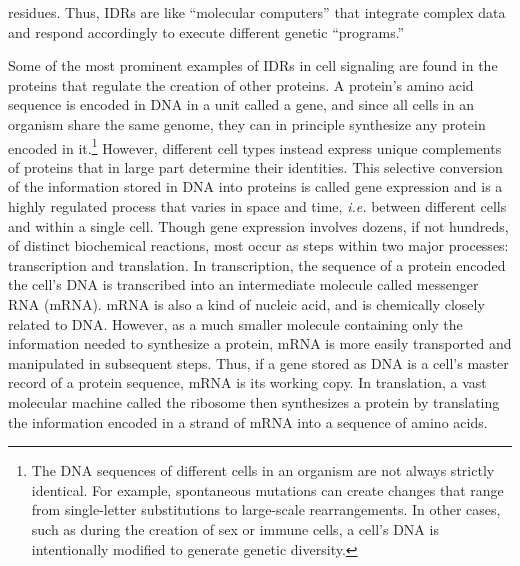 residues. Thus, IDRs are like ``molecular computers'' that integrate complex data and respond accordingly to execute different genetic ``programs.''

Some of the most prominent examples of IDRs in cell signaling are found in the proteins that regulate the creation of other proteins. A protein's amino acid sequence is encoded in DNA in a unit called a gene, and since all cells in an organism share the same genome, they can in principle synthesize any protein encoded in it.\footnote{The DNA sequences of different cells in an organism are not always strictly identical. For example, spontaneous mutations can create changes that range from single-letter substitutions to large-scale rearrangements. In other cases, such as during the creation of sex or immune cells, a cell's DNA is intentionally modified to generate genetic diversity.} However, different cell types instead express unique complements of proteins that in large part determine their identities. This selective conversion of the information stored in DNA into proteins is called gene expression and is a highly regulated process that varies in space and time, \textit{i.e.} between different cells and within a single cell. Though gene expression involves dozens, if not hundreds, of distinct biochemical reactions, most occur as steps within two major processes: transcription and translation. In transcription, the sequence of a protein encoded the cell's DNA is transcribed into an intermediate molecule called messenger RNA (mRNA). mRNA is also a kind of nucleic acid, and is chemically closely related to DNA. However, as a much smaller molecule containing only the information needed to synthesize a protein, mRNA is more easily transported and manipulated in subsequent steps. Thus, if a gene stored as DNA is a cell's master record of a protein sequence, mRNA is its working copy. In translation, a vast molecular machine called the ribosome then synthesizes a protein by translating the information encoded in a strand of mRNA into a sequence of amino acids.

